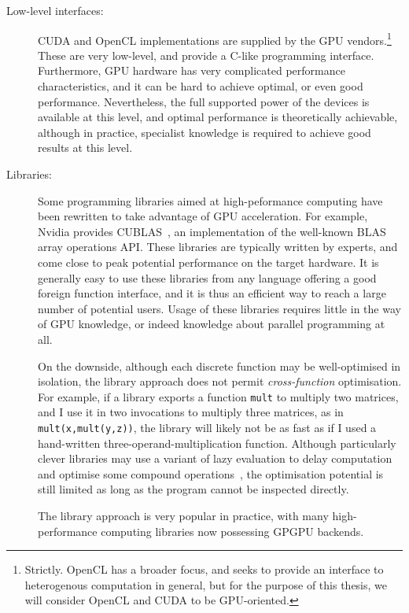 \begin{description}
\item[Low-level interfaces:] CUDA and OpenCL implementations are
  supplied by the GPU vendors.\footnote{Strictly. OpenCL has a broader
    focus, and seeks to provide an interface to heterogenous
    computation in general, but for the purpose of this thesis, we
    will consider OpenCL and CUDA to be GPU-oriented.}  These are very
  low-level, and provide a C-like programming interface.  Furthermore,
  GPU hardware has very complicated performance characteristics, and
  it can be hard to achieve optimal, or even good performance.
  Nevertheless, the full supported power of the devices is available
  at this level, and optimal performance is theoretically achievable,
  although in practice, specialist knowledge is required to achieve
  good results at this level.

\item[Libraries:] Some programming libraries aimed at high-peformance
  computing have been rewritten to take advantage of GPU acceleration.
  For example, Nvidia provides CUBLAS~\cite{nvidia2008cublas}, an
  implementation of the well-known BLAS array operations API.  These
  libraries are typically written by experts, and come close to peak
  potential performance on the target hardware.  It is generally easy
  to use these libraries from any language offering a good foreign
  function interface, and it is thus an efficient way to reach a large
  number of potential users.  Usage of these libraries requires little
  in the way of GPU knowledge, or indeed knowledge about parallel
  programming at all.

  On the downside, although each discrete function may be
  well-optimised in isolation, the library approach does not permit
  \textit{cross-function} optimisation.  For example, if a library
  exports a function \texttt{mult} to multiply two matrices, and I use
  it in two invocations to multiply three matrices, as in
  \texttt{mult(x,mult(y,z))}, the library will likely not be as fast
  as if I used a hand-written three-operand-multiplication function.
  Although particularly clever libraries may use a variant of lazy
  evaluation to delay computation and optimise some compound
  operations~\cite{kristensenbohrium}, the optimisation potential is
  still limited as long as the program cannot be inspected directly.

  The library approach is very popular in practice, with many
  high-performance computing libraries now possessing GPGPU backends.


\end{description}
